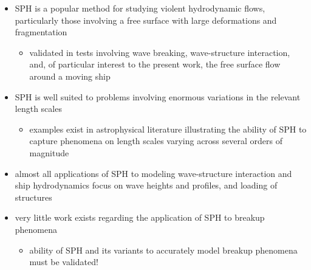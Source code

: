 \begin{frame}{\thesec}{\thesubsec}
  \vspace*{-2\baselineskip}
  \begin{itemize}
    \item{
      SPH is a popular method for studying violent hydrodynamic flows, particularly those involving a free surface with large deformations and fragmentation
      \begin{itemize}
        \item{
          validated in tests involving wave breaking, wave-structure interaction, and, of particular interest to the present work, the free surface flow around a moving ship
        }
      \end{itemize}
    }
    \item{
      SPH is well suited to problems involving enormous variations in the relevant length scales
      \begin{itemize}
        \item{
          examples exist in astrophysical literature illustrating the ability of SPH to capture phenomena on length scales varying across several orders of magnitude
        }
      \end{itemize}
    }
  \end{itemize}
\end{frame}

\begin{frame}{\thesec}{\thesubsec}
  \vspace*{-2\baselineskip}
  \begin{itemize}
    \item{
      almost all applications of SPH to modeling wave-structure interaction and ship hydrodynamics focus on wave heights and profiles, and loading of structures
    }
    \vspace*{2\baselineskip}
    \item{
      very little work exists regarding the application of SPH to breakup phenomena
      \begin{itemize}
        \item{
          ability of SPH and its variants to accurately model breakup phenomena must be validated!
        } 
      \end{itemize}
    }
  \end{itemize}
\end{frame}

